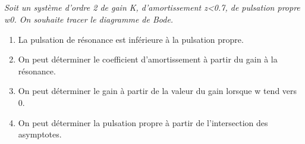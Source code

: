 \documentclass[10pt,fleqn]{article} %
\begin{document}
\begin{multicols}{2}
\subparagraph{}\textit{Soit un système d'ordre 2 de gain K, d'amortissement z<0.7, de pulsation
propre w0. On souhaite tracer le diagramme de Bode.}
\begin{enumerate}
\item La pulsation de résonance est inférieure à la pulsation propre.
\item On peut déterminer le coefficient d'amortissement à partir du gain à la résonance.
\item On peut déterminer le gain à partir de la valeur du gain lorsque w tend vers 0.
\item On peut déterminer la pulsation propre à partir de l'intersection des asymptotes.
\end{enumerate}


\end{multicols}
\end{document}
